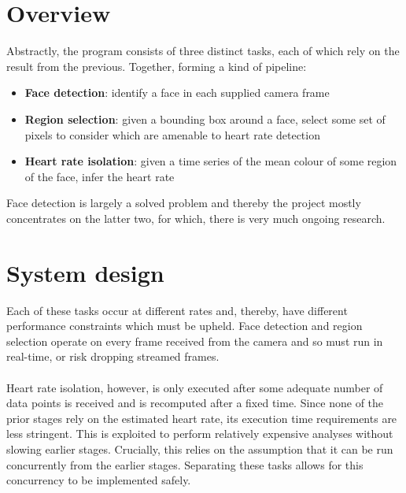 \section{Overview}
Abstractly, the program consists of three distinct tasks, each of which rely on the result from the previous. Together, forming a kind of pipeline:
\begin{itemize}
    \item \textbf{Face detection}: identify a face in each supplied camera frame
    \item \textbf{Region selection}: given a bounding box around a face, select some set of pixels to consider which are amenable to heart rate detection
    \item \textbf{Heart rate isolation}: given a time series of the mean colour of some region of the face, infer the heart rate
\end{itemize}
Face detection is largely a solved problem and thereby the project mostly concentrates on the latter two, for which, there is very much ongoing research.

\section{System design}
Each of these tasks occur at different rates and, thereby, have different performance constraints which must be upheld. Face detection and region selection operate on every frame received from the camera and so must run in real-time, or risk dropping streamed frames.
\\ \\
Heart rate isolation, however, is only executed after some adequate number of data points is received and is recomputed after a fixed time. Since none of the prior stages rely on the estimated heart rate, its execution time requirements are less stringent. This is exploited to perform relatively expensive analyses without slowing earlier stages. Crucially, this relies on the assumption that it can be run concurrently from the earlier stages.
Separating these tasks allows for this concurrency to be implemented safely.

